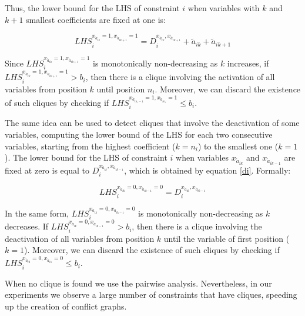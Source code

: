 \documentclass{endm}
\begin{document}
\noindent Thus, the lower bound for the LHS of constraint $i$ when variables with $k$ and $k+1$ smallest coefficients are fixed at one is:

\begin{equation}
LHS_{i}^{x_{\acute{a}_{ik}} = 1, x_{\acute{a}_{ik+1}} = 1} = D_{i}^{x_{\acute{a}_{ik}}, x_{\acute{a}_{ik+1}}} + \tilde{a}_{ik} + \tilde{a}_{ik+1}
\end{equation}

Since $LHS_{i}^{x_{\acute{a}_{ik}} = 1, x_{\acute{a}_{ik+1}} = 1}$ is monotonically non-decreasing as $k$ increases, if $LHS_{i}^{x_{\acute{a}_{ik}} = 1, x_{\acute{a}_{ik+1}} = 1} > b_{i}$, then there is a clique involving the activation of all variables from position $k$ until position $n_i$. Moreover, we can discard the existence of such cliques by checking if $LHS_{i}^{x_{\acute{a}_{in_i-1}} = 1, x_{\acute{a}_{in_i}} = 1} \leq b_i$.

The same idea can be used to detect cliques that involve the deactivation of some variables, computing the lower bound of the LHS for each two consecutive variables, starting from the highest coefficient ($k=n_i$) to the smallest one ($k=1$). The lower bound for the LHS of constraint $i$ when variables $x_{\acute{a}_{ik}}$ and $x_{\acute{a}_{ik-1}}$ are fixed at zero is equal to $D_{i}^{x_{\acute{a}_{ik}}, x_{\acute{a}_{ik-1}}}$, which is obtained by equation \ref{di}. Formally:

\begin{equation}
LHS_{i}^{x_{\acute{a}_{ik}} = 0, x_{\acute{a}_{ik-1}} = 0} = D_{i}^{x_{\acute{a}_{ik}}, x_{\acute{a}_{ik-1}}}
\end{equation}

In the same form, $LHS_{i}^{x_{\acute{a}_{ik}} = 0, x_{\acute{a}_{ik-1}} = 0}$ is monotonically non-decreasing as $k$ decreases. If $LHS_{i}^{x_{\acute{a}_{ik}} = 0, x_{\acute{a}_{ik-1}} = 0} > b_{i}$, then there is a clique involving the deactivation of all variables from position $k$ until the variable of first position ($k=1$). Moreover, we can discard the existence of such cliques by checking if $LHS_{i}^{x_{\acute{a}_{i2}} = 0, x_{\acute{a}_{i1}} = 0} \leq b_i$.

When no clique is found we use the pairwise analysis. Nevertheless, in our experiments we observe a large number of constraints that have cliques, speeding up the creation of conflict graphs.
\end{document}

